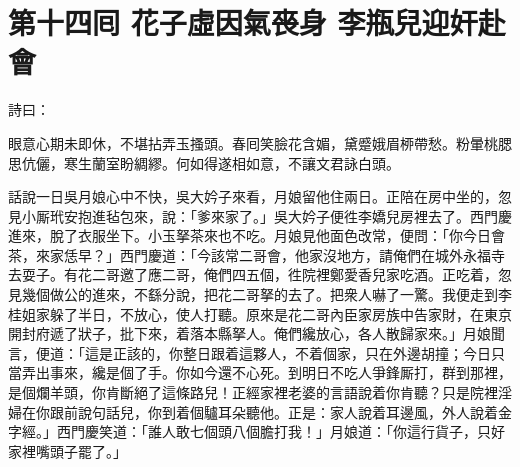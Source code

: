 
\chapter*{第十四囘 花子虛因氣䘮身 李瓶兒迎奸赴會}


詩曰：

眼意心期未即休，不堪拈弄玉搔頭。春囘笑臉花含媚，黛蹙娥眉桺帶愁。粉暈桃腮思伉儷，寒生蘭室盼綢繆。何如得遂相如意，不讓文君詠白頭。

話說一日吳月娘心中不快，吳大妗子來看，月娘留他住兩日。正陪在房中坐的，忽見小厮玳安抱進毡包來，說：「爹來家了。」吳大妗子便徃李嬌兒房裡去了。西門慶進來，脫了衣服坐下。小玉拏茶來也不吃。月娘見他面色改常，便問：「你今日會茶，來家恁早？」西門慶道：「今該常二哥會，他家沒地方，請俺們在城外永福寺去耍子。有花二哥邀了應二哥，俺們四五個，徃院裡鄭愛香兒家吃酒。正吃着，忽見幾個做公的進來，不繇分說，把花二哥拏的去了。把衆人嚇了一驚。我便走到李桂姐家躲了半日，不放心，使人打聽。原來是花二哥內臣家房族中告家財，在東京開封府遞了狀子，批下來，着落本縣拏人。俺們纔放心，各人散歸家來。」月娘聞言，便道：「這是正該的，你整日跟着這夥人，不着個家，只在外邊胡撞；今日只當弄出事來，纔是個了手。你如今還不心死。到明日不吃人爭鋒厮打，群到那裡，是個爛羊頭，你肯斷絕了這條路兒！正經家裡老婆的言語說着你肯聽？只是院裡淫婦在你跟前說句話兒，你到着個驢耳朵聽他。正是：家人說着耳邊風，外人說着金字經。」西門慶笑道：「誰人敢七個頭八個膽打我！」{}月娘道：「你這行貨子，只好家裡嘴頭子罷了。」

